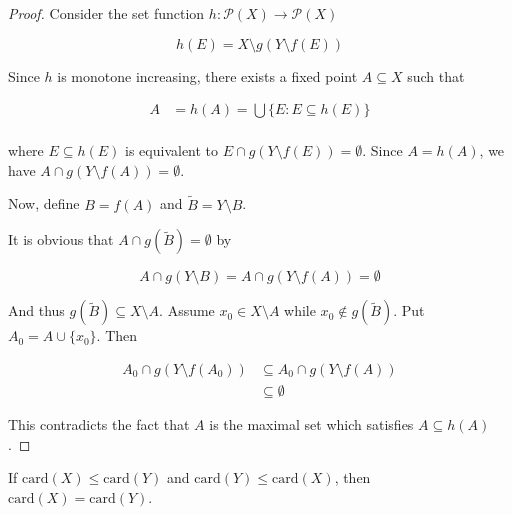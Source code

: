 \begin{proof}
    Consider the set function $h: \mathscr{P}(X) \to \mathscr{P}(X)$

    \[
        h(E) =  X \setminus g(Y \setminus f(E)) 
    \]

    Since $h$ is monotone increasing, there exists a fixed point $A \subseteq X$ such that

    \begin{align*}
        A &= h(A) = \bigcup \{ E: E \subseteq h(E) \} \\
    \end{align*}

    where $E \subseteq h(E)$ is equivalent to $E \cap g(Y \setminus f(E)) = \emptyset$.
    Since $A = h(A)$, we have $A \cap g(Y \setminus f(A)) = \emptyset$.

    Now, define $B = f(A)$ and $\tilde{B} = Y \setminus B$.

    It is obvious that $A \cap g(\tilde{B}) = \emptyset$ by

    \[
        A \cap g(Y \setminus B) =  A \cap g(Y \setminus f(A)) = \emptyset
    \]

    And thus $g(\tilde{B}) \subseteq X \setminus A$. Assume $x_0 \in X \setminus A$ while $x_0 \notin g(\tilde{B})$.
    Put $A_0 = A \cup \{ x_0 \}$. Then

    \begin{align*}
        A_0 \cap g(Y \setminus f(A_0)) & \subseteq A_0  \cap g(Y \setminus f(A)) \\
        & \subseteq \emptyset 
    \end{align*}

    This contradicts the fact that $A$ is the maximal set which satisfies $A \subseteq h(A)$.
\end{proof}

\begin{thm}
    If $\mathrm{card}(X) \le \mathrm{card}(Y)$ and $\mathrm{card}(Y) \le \mathrm{card}(X)$, then
    $\mathrm{card}(X) = \mathrm{card}(Y)$. 
\end{thm}

